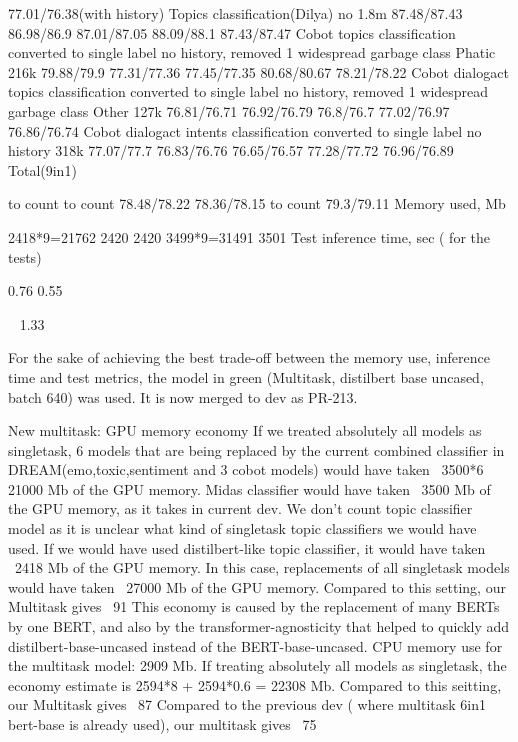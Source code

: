77.01/76.38(with history)
Topics classification(Dilya)
no
1.8m
87.48/87.43
86.98/86.9
87.01/87.05
88.09/88.1
87.43/87.47
Cobot topics classification
converted to single label no history, removed 1 widespread garbage class Phatic
216k
79.88/79.9
77.31/77.36
77.45/77.35
80.68/80.67
78.21/78.22
Cobot dialogact topics classification
converted to single label no history, removed 1 widespread garbage class Other
127k
76.81/76.71
76.92/76.79
76.8/76.7
77.02/76.97
76.86/76.74
Cobot dialogact intents classification
converted to single label no history
318k
77.07/77.7
76.83/76.76
76.65/76.57
77.28/77.72
76.96/76.89
Total(9in1)


to count
to count
78.48/78.22
78.36/78.15
to count
79.3/79.11
Memory used, Mb




2418*9=21762
2420
2420
3499*9=31491
3501
Test inference time, sec ( for the tests)






0.76
0.55


~ 1.33


For the sake of achieving the best trade-off between the memory use, inference time and test metrics, the model in green (Multitask, distilbert base uncased, batch 640) was used. It is now merged to dev as PR-213.


New multitask: GPU memory economy
If we treated absolutely all models as singletask, 6 models that are being replaced by the current combined classifier in DREAM(emo,toxic,sentiment and 3 cobot models) would have taken ~3500*6 ~ 21000 Mb of the GPU memory. Midas classifier would have taken ~3500 Mb of the GPU memory, as it takes in current dev.  We don’t count topic classifier model as it is unclear what kind of singletask topic classifiers we would have used. If we would have used distilbert-like topic classifier, it would have taken ~2418 Mb of the GPU memory. In this case, replacements of all singletask models would have taken ~27000 Mb of the GPU memory.  Compared to this setting, our Multitask gives ~91%
This economy is caused by the replacement of many BERTs by one BERT, and also by the transformer-agnosticity that helped to quickly add distilbert-base-uncased instead of the BERT-base-uncased.
CPU memory use for the multitask model: 2909 Mb. If treating absolutely all models as singletask, the economy estimate is 2594*8 + 2594*0.6 = 22308 Mb. Compared to this seitting, our Multitask gives ~87%
Compared to the previous dev ( where multitask 6in1 bert-base is already used), our multitask gives ~75%



